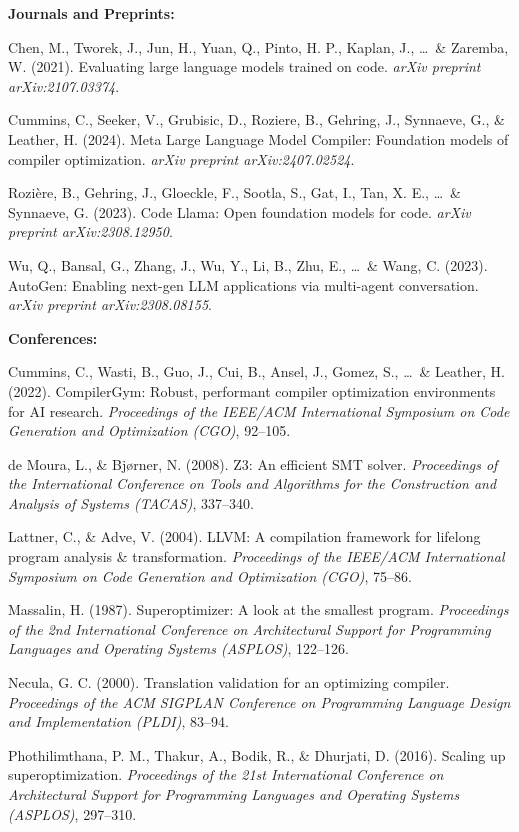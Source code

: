 \documentclass[12pt,a4paper]{report}
\newcommand{\apa}[1]{\par\hangindent=1.27cm\hangafter=1 #1\par}
\newcommand{\refgroup}[1]{\par\vspace{0.35cm}\noindent\textbf{#1}\par\vspace{0.1cm}}
\begin{document}
\refgroup{Journals and Preprints:}

\apa{Chen, M., Tworek, J., Jun, H., Yuan, Q., Pinto, H. P., Kaplan, J., \ldots\ \& Zaremba, W. (2021). Evaluating large language models trained on code. \textit{arXiv preprint arXiv:2107.03374}.}

\apa{Cummins, C., Seeker, V., Grubisic, D., Roziere, B., Gehring, J., Synnaeve, G., \& Leather, H. (2024). Meta Large Language Model Compiler: Foundation models of compiler optimization. \textit{arXiv preprint arXiv:2407.02524}.}

\apa{Rozi\`ere, B., Gehring, J., Gloeckle, F., Sootla, S., Gat, I., Tan, X. E., \ldots\ \& Synnaeve, G. (2023). Code Llama: Open foundation models for code. \textit{arXiv preprint arXiv:2308.12950}.}

\apa{Wu, Q., Bansal, G., Zhang, J., Wu, Y., Li, B., Zhu, E., \ldots\ \& Wang, C. (2023). AutoGen: Enabling next-gen LLM applications via multi-agent conversation. \textit{arXiv preprint arXiv:2308.08155}.}

\refgroup{Conferences:}

\apa{Cummins, C., Wasti, B., Guo, J., Cui, B., Ansel, J., Gomez, S., \ldots\ \& Leather, H. (2022). CompilerGym: Robust, performant compiler optimization environments for AI research. \textit{Proceedings of the IEEE/ACM International Symposium on Code Generation and Optimization (CGO)}, 92--105.}

\apa{de Moura, L., \& Bj{\o}rner, N. (2008). Z3: An efficient SMT solver. \textit{Proceedings of the International Conference on Tools and Algorithms for the Construction and Analysis of Systems (TACAS)}, 337--340.}

\apa{Lattner, C., \& Adve, V. (2004). LLVM: A compilation framework for lifelong program analysis \& transformation. \textit{Proceedings of the IEEE/ACM International Symposium on Code Generation and Optimization (CGO)}, 75--86.}

\apa{Massalin, H. (1987). Superoptimizer: A look at the smallest program. \textit{Proceedings of the 2nd International Conference on Architectural Support for Programming Languages and Operating Systems (ASPLOS)}, 122--126.}

\apa{Necula, G. C. (2000). Translation validation for an optimizing compiler. \textit{Proceedings of the ACM SIGPLAN Conference on Programming Language Design and Implementation (PLDI)}, 83--94.}

\apa{Phothilimthana, P. M., Thakur, A., Bodik, R., \& Dhurjati, D. (2016). Scaling up superoptimization. \textit{Proceedings of the 21st International Conference on Architectural Support for Programming Languages and Operating Systems (ASPLOS)}, 297--310.}
\end{document}

